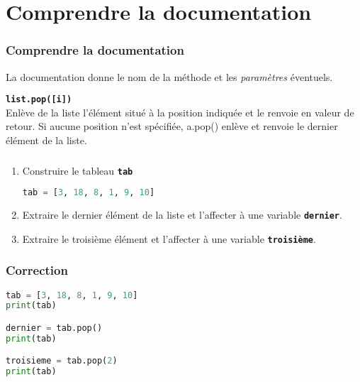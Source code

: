 \documentclass[svgnames,11pt]{beamer}
\begin{document}
\section{Comprendre la documentation}
\begin{frame}
    \frametitle{Comprendre la documentation}

\begin{aretenir}[]
    La documentation donne le nom de la méthode et les \emph{paramètres} éventuels.
\end{aretenir}
\begin{framed}
    \texttt{\textbf{list.pop([i])}}\\
Enlève de la liste l'élément situé à la position indiquée et le renvoie en valeur de retour. Si aucune position n'est spécifiée, a.pop() enlève et renvoie le dernier élément de la liste.
\end{framed}
\end{frame}
\begin{frame}[fragile]
    \frametitle{}

    \begin{activite}
    \begin{enumerate}
        \item Construire le tableau \textbf{\texttt{tab}}
\begin{lstlisting}[language=Python , basicstyle=\ttfamily\small, xleftmargin=2em, xrightmargin=2em]
tab = [3, 18, 8, 1, 9, 10]
\end{lstlisting}
        \item Extraire le dernier élément de la liste et l'affecter à une variable \textbf{\texttt{dernier}}.
        \item Extraire le troisième élément et l'affecter à une variable \textbf{\texttt{troisième}}.
    \end{enumerate}
    \end{activite}

\end{frame}
\begin{frame}[fragile]
    \frametitle{Correction}

    \begin{lstlisting}[language=Python , basicstyle=\ttfamily\small, xleftmargin=2em, xrightmargin=2em]
tab = [3, 18, 8, 1, 9, 10]
print(tab)

dernier = tab.pop()
print(tab)

troisieme = tab.pop(2)
print(tab)
\end{lstlisting}    

\end{frame}
\end{document}
